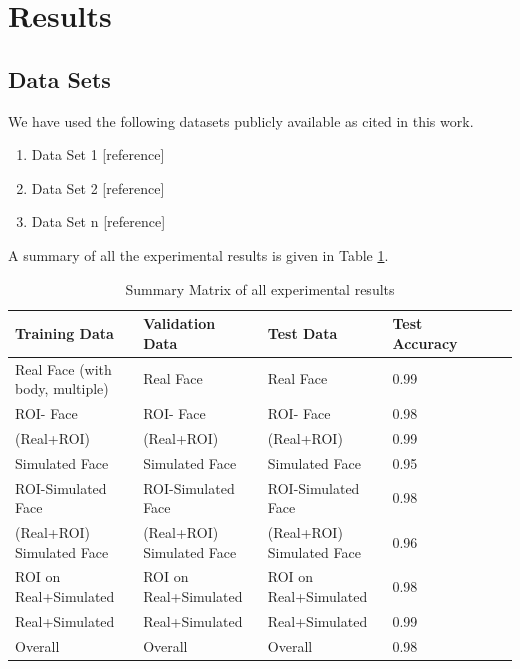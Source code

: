\documentclass{svproc}
\begin{document}
\section{Results}
\subsection{Data Sets}
We have used the following datasets publicly available as cited in this work. 
\begin{enumerate}
  \item Data Set 1 [reference]
  \item Data Set 2 [reference]
  \item Data Set n [reference]
\end{enumerate}

A summary of all the experimental results is given in Table \ref{expResult}.

\begin{table}[]
\begin{tabular}{lllllll}
\hline
Training Data                   & Validation Data           & Test Data                 & Test Accuracy \\
\hline
Real Face (with body, multiple) & Real Face                 & Real Face                 & 0.99         \\
ROI- Face                       & ROI- Face                 & ROI- Face                 & 0.98                    \\
(Real+ROI)                      & (Real+ROI)                & (Real+ROI)                & 0.99                \\
Simulated Face                  & Simulated Face            & Simulated Face            & 0.95            \\
ROI-Simulated Face              & ROI-Simulated Face        & ROI-Simulated Face        & 0.98 \\
(Real+ROI) Simulated Face       & (Real+ROI) Simulated Face & (Real+ROI) Simulated Face & 0.96\\
ROI on Real+Simulated           & ROI on Real+Simulated     & ROI on Real+Simulated     & 0.98 \\
Real+Simulated                  & Real+Simulated            & Real+Simulated            & 0.99 \\
Overall                         & Overall                   & Overall                   & 0.98  \\
\hline
\end{tabular}
\caption{Summary Matrix of all experimental results}
\label{expResult}
\end{table}
\end{document}

